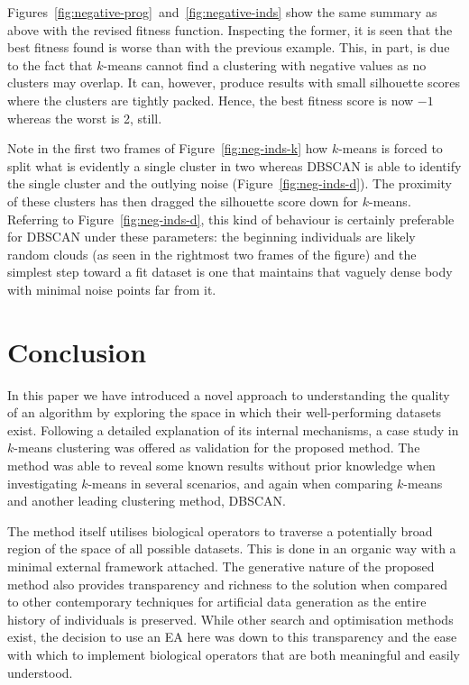 \documentclass[smallextended]{svjour3}
\begin{document}
Figures~\ref{fig:negative-prog}~and~\ref{fig:negative-inds} show the same
summary as above with the revised fitness function. Inspecting the former, it is
seen that the best fitness found is worse than with the previous example. This,
in part, is due to the fact that \(k\)-means cannot find a clustering with
negative values as no clusters may overlap. It can, however, produce results
with small silhouette scores where the clusters are tightly packed. Hence, the
best fitness score is now \(-1\) whereas the worst is 2, still.

Note in the first two frames of Figure~\ref{fig:neg-inds-k} how \(k\)-means is
forced to split what is evidently a single cluster in two whereas DBSCAN is able
to identify the single cluster and the outlying noise
(Figure~\ref{fig:neg-inds-d}). The proximity of these clusters has then dragged
the silhouette score down for \(k\)-means. Referring to
Figure~\ref{fig:neg-inds-d}, this kind of behaviour is certainly preferable for
DBSCAN under these parameters: the beginning individuals are likely random
clouds (as seen in the rightmost two frames of the figure) and the simplest step
toward a fit dataset is one that maintains that vaguely dense body with minimal
noise points far from it.


\section{Conclusion}

In this paper we have introduced a novel approach to understanding the quality
of an algorithm by exploring the space in which their well-performing datasets
exist. Following a detailed explanation of its internal mechanisms, a case study
in \(k\)-means clustering was offered as validation for the proposed method.
The method was able to reveal some known results without prior knowledge when
investigating \(k\)-means in several scenarios, and again when comparing
\(k\)-means and another leading clustering method, DBSCAN.\

The method itself utilises biological operators to traverse a potentially broad
region of the space of all possible datasets. This is done in an organic way
with a minimal external framework attached. The generative nature of the
proposed method also provides transparency and richness to the solution when
compared to other contemporary techniques for artificial data generation as the
entire history of individuals is preserved. While other search and optimisation
methods exist, the decision to use an EA here was down to this transparency and
the ease with which to implement biological operators that are both meaningful
and easily understood. 
\end{document}
